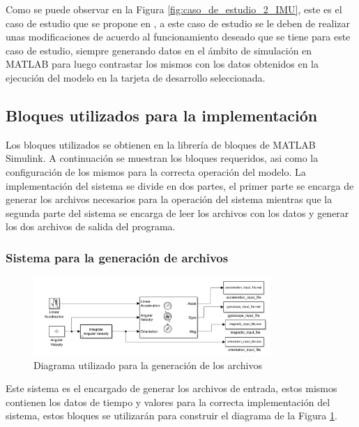 Como se puede observar en la Figura \ref{fig:caso_de_estudio_2_IMU}, este es el caso de estudio que se propone en \cite{mathworks2024imu}, a este caso de estudio se le deben de realizar unas modificaciones de acuerdo al funcionamiento deseado que se tiene para este caso de estudio, siempre generando datos en el ámbito de simulación en MATLAB para luego contrastar los mismos con los datos obtenidos en la ejecución del modelo en la tarjeta de desarrollo seleccionada.

\subsection{Bloques utilizados para la implementación}

Los bloques utilizados se obtienen en la librería de bloques de MATLAB Simulink. A continuación se muestran los bloques requeridos, asi como la configuración de los mismos para la correcta operación del modelo. La implementación del sistema se divide en dos partes, el primer parte se encarga de generar los archivos necesarios para la operación del sistema mientras que la segunda parte del sistema se encarga de leer los archivos con los datos y generar los dos archivos de salida del programa.

\subsubsection{Sistema para la generación de archivos}\label{subsub:generación_de_archivos}

\begin{figure}[h!]
    \centering
    \includegraphics[width=0.8\textwidth]{fig/Capitulo5/Caso_de_estudio_IMU/Generador_de_archivos/flujo_generador_de_archivos.png}
    \caption{Diagrama utilizado para la generación de los archivos \cite{mathworks2024imu}}
    \label{fig:caso_de_estudio_2_IMU_generación_de_archivos}
\end{figure}

Este sistema es el encargado de generar los archivos de entrada, estos mismos contienen los datos de tiempo y valores para la correcta implementación del sistema, estos bloques se utilizarán para construir el diagrama de la Figura \ref{fig:caso_de_estudio_2_IMU_generación_de_archivos}.


